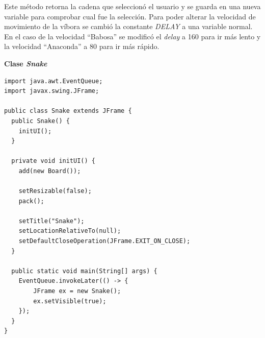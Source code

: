 \documentclass[11pt, twocolumn]{article}
\begin{document}
  Este método retorna la cadena que seleccionó el usuario y se guarda en una nueva variable para comprobar cual fue la selección. Para poder alterar la velocidad de movimiento de la víbora se cambió la constante \textit{DELAY} a una variable normal. En el caso de la velocidad ``Babosa'' se modificó el \textit{delay} a 160 para ir más lento y la velocidad ``Anaconda'' a 80 para ir más rápido.

  \textbf{Clase \textit{Snake}}
  \begin{lstlisting}
import java.awt.EventQueue;
import javax.swing.JFrame;

public class Snake extends JFrame {
  public Snake() {
    initUI();
  }

  private void initUI() {
    add(new Board());

    setResizable(false);
    pack();

    setTitle("Snake");
    setLocationRelativeTo(null);
    setDefaultCloseOperation(JFrame.EXIT_ON_CLOSE);
  }

  public static void main(String[] args) {
    EventQueue.invokeLater(() -> {
        JFrame ex = new Snake();
        ex.setVisible(true);
    });
  }
}
  \end{lstlisting}
\end{document}
